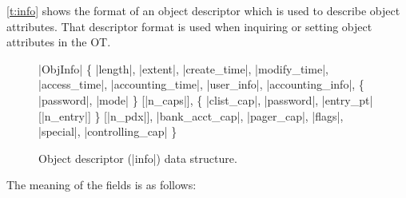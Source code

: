 \documentclass[a4paper,11pt,twoside,dvips]{report}
\begin{document}
\autoref{t:info} shows the format of an object descriptor which is
used to describe object attributes. That descriptor format is used when
inquiring or setting object attributes in the OT.
\begin{figure}[htb]
\begin{center}
\begin{programbox}
\TYPE |ObjInfo| \BODY \{
	|length|, |extent|,
	|create\_time|, |modify\_time|, |access\_time|, |accounting\_time|,
	|user\_info|, |accounting\_info|,
	\{ |password|, |mode| \} [|n_caps|],
	\{ |clist\_cap|, |password|, |entry\_pt| [|n_entry|] \} [|n\_pdx|],
	|bank\_acct\_cap|, |pager\_cap|, |flags|,
	|special|, |controlling\_cap|
\ENDTYPE\}
\end{programbox}
\caption{\label{t:info}Object descriptor (|info|) data structure.}
\end{center}
\end{figure}
The meaning of the
fields is as follows:
\end{document}
